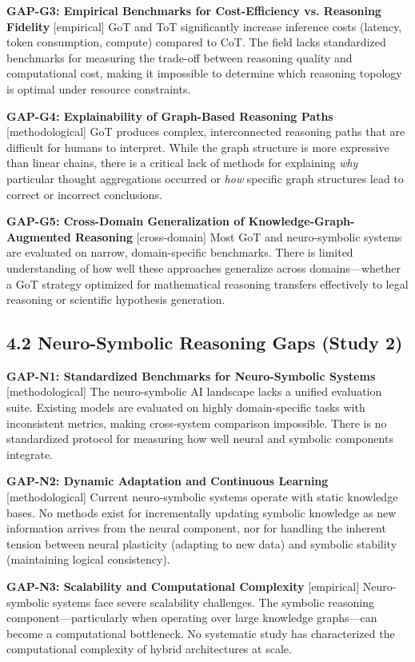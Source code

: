 \documentclass[11pt,a4paper]{article}
\begin{document}
\textbf{GAP-G3: Empirical Benchmarks for Cost-Efficiency vs. Reasoning Fidelity} [empirical]
GoT and ToT significantly increase inference costs (latency, token consumption, compute) compared to CoT. The field lacks standardized benchmarks for measuring the trade-off between reasoning quality and computational cost, making it impossible to determine which reasoning topology is optimal under resource constraints.

\textbf{GAP-G4: Explainability of Graph-Based Reasoning Paths} [methodological]
GoT produces complex, interconnected reasoning paths that are difficult for humans to interpret. While the graph structure is more expressive than linear chains, there is a critical lack of methods for explaining \textit{why} particular thought aggregations occurred or \textit{how} specific graph structures lead to correct or incorrect conclusions.

\textbf{GAP-G5: Cross-Domain Generalization of Knowledge-Graph-Augmented Reasoning} [cross-domain]
Most GoT and neuro-symbolic systems are evaluated on narrow, domain-specific benchmarks. There is limited understanding of how well these approaches generalize across domains—whether a GoT strategy optimized for mathematical reasoning transfers effectively to legal reasoning or scientific hypothesis generation.

\subsection{4.2 Neuro-Symbolic Reasoning Gaps (Study 2)}

\textbf{GAP-N1: Standardized Benchmarks for Neuro-Symbolic Systems} [methodological]
The neuro-symbolic AI landscape lacks a unified evaluation suite. Existing models are evaluated on highly domain-specific tasks with inconsistent metrics, making cross-system comparison impossible. There is no standardized protocol for measuring how well neural and symbolic components integrate.

\textbf{GAP-N2: Dynamic Adaptation and Continuous Learning} [methodological]
Current neuro-symbolic systems operate with static knowledge bases. No methods exist for incrementally updating symbolic knowledge as new information arrives from the neural component, nor for handling the inherent tension between neural plasticity (adapting to new data) and symbolic stability (maintaining logical consistency).

\textbf{GAP-N3: Scalability and Computational Complexity} [empirical]
Neuro-symbolic systems face severe scalability challenges. The symbolic reasoning component—particularly when operating over large knowledge graphs—can become a computational bottleneck. No systematic study has characterized the computational complexity of hybrid architectures at scale.
\end{document}
